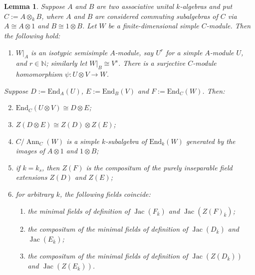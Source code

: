 \documentclass[11pt,reqno]{amsart}
\newtheorem{lemma}{Lemma}[subsection]
\theoremstyle{definition}
\theoremstyle{remark}
\theoremstyle{definition}
\theoremstyle{plain}
\DeclareMathOperator{\Ann}{Ann}
\DeclareMathOperator{\Jac}{Jac}
\newcommand{\End}{\mathrm{End}}
\newcommand{\NN}{\mathbb{N}}
\newcommand{\bark}{{\overline{k}}}
\begin{document}
\begin{lemma}\label{directproduct}Suppose $A$ and $B$ are two  associative unital $k$-algebras and put $C:=A\otimes_k B$, where $A$ and $B$ are considered commuting subalgebras of $C$ via $A\cong A\otimes 1$ and $B\cong 1\otimes B$. 
  Let $W$ be a finite-dimensional simple $C$-module. Then the following hold:
 \begin{enumerate}
   \item $W|_{A}$ is an  isotypic semisimple $A$-module, say $U^r$ for a simple $A$-module $U$, and $r\in\NN$; similarly let $W|_{B}\cong V^s$. There is a surjective $C$-module homomorphism $\psi:U\otimes V\to W$.\label{ds3}
 \end{enumerate}
   Suppose $D:=\End_A(U)$, $E:=\End_B(V)$ and $F:=\End_C(W)$. Then:
   \begin{enumerate}
   \setcounter{enumi}{1}
   \item $\End_C(U\otimes V)\cong D\otimes E$;\label{ds1}
   \item $Z(D\otimes E)\cong Z(D)\otimes Z(E)$;\label{ds2}
   \item $C/\Ann_C(W)$ is a simple $k$-subalgebra of $\End_k(W)$ generated by the images of $A\otimes 1$ and $1\otimes B$; \label{ds4}
   \item if $k=k_s$, then $Z(F)$ is the compositum of the purely inseparable field extensions $Z(D)$ and $Z(E)$;\label{ds5}
   \item for arbitrary $k$, the following fields coincide\label{ds6}:
   \begin{enumerate}\item the minimal fields of definition of $\Jac(F_\bark)$ and $\Jac(Z(F)_\bark)$; 
     \item the compositum of the minimal fields of definition of $\Jac(D_\bark)$ and $\Jac(E_\bark)$;
     \item the compositum of the minimal fields of definition of $\Jac(Z(D_\bark))$ and $\Jac(Z(E_\bark))$.\label{dstest}
   \end{enumerate}
 \end{enumerate}
\end{lemma}
\end{document}
